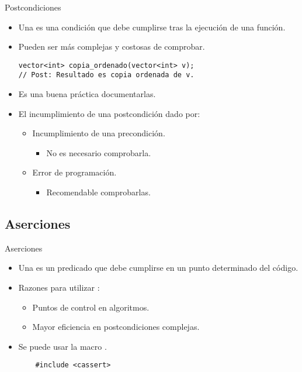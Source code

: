 \begin{frame}[t,fragile]{Postcondiciones}
\begin{itemize}
  \item Una  es una condición que debe cumplirse tras
        la ejecución de una función.

  \item Pueden ser más complejas y costosas de comprobar.
\begin{lstlisting}
vector<int> copia_ordenado(vector<int> v);
// Post: Resultado es copia ordenada de v.
\end{lstlisting}

  \item Es una buena práctica documentarlas.

  \item El incumplimiento de una postcondición dado por:
    \begin{itemize}
      \item Incumplimiento de una precondición.
        \begin{itemize}
          \item No es necesario comprobarla.
        \end{itemize}
      \item Error de programación.
        \begin{itemize}
          \item Recomendable comprobarlas.
        \end{itemize}
    \end{itemize}
\end{itemize}
\end{frame}

\subsection{Aserciones}

\begin{frame}[t,fragile]{Aserciones}
\begin{itemize}
  \item Una  es un predicado que debe cumplirse
        en un punto determinado del código.

  \item Razones para utilizar :
    \begin{itemize}
      \item Puntos de control en algoritmos.
      \item Mayor eficiencia en postcondiciones complejas.
    \end{itemize}

  \item Se puede usar la macro .
    \begin{lstlisting}
    #include <cassert>
    \end{lstlisting}
\end{itemize}
\end{frame}
